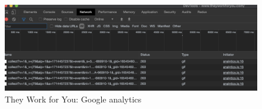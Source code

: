 \begin{figure}[h]
  \centering
  \includegraphics[scale=0.25]{images/they-work-for-you-challenges-google-analytics}
  \caption{They Work for You: Google analytics}
  \label{fig:they-work-for-you-challenges-google-analytics}
\end{figure}